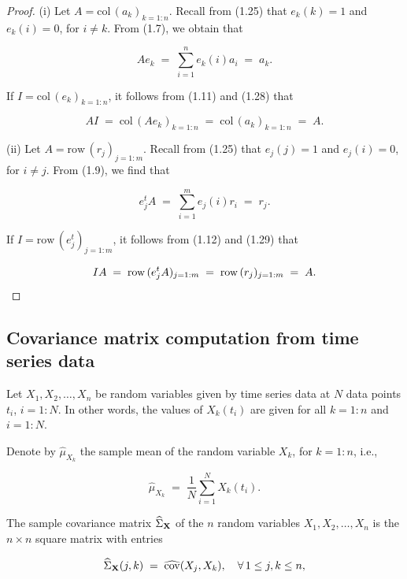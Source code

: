 \begin{proof}
(i) Let $A=\mathrm{col}\,(a_k)_{k=1:n}$. Recall from (1.25) that
$e_k(k)=1$ and $e_k(i)=0$, for $i\ne k$. From (1.7), we obtain that

\begin{equation}
Ae_k \;=\; \sum_{i=1}^n e_k(i)a_i \;=\; a_k.
\end{equation}

If $I=\mathrm{col}\,(e_k)_{k=1:n}$, it follows from (1.11) and (1.28) that

\[
AI \;=\; \mathrm{col}\,(Ae_k)_{k=1:n} \;=\; \mathrm{col}\,(a_k)_{k=1:n} \;=\; A.
\]

(ii) Let $A=\mathrm{row}\,(r_j)_{j=1:m}$. Recall from (1.25) that
$e_j(j)=1$ and $e_j(i)=0$, for $i\ne j$. From (1.9), we find that

\begin{equation}
e_j^tA \;=\; \sum_{i=1}^m e_j(i)r_i \;=\; r_j.
\end{equation}

If $I=\mathrm{row}\,(e_j^t)_{j=1:m}$, it follows from (1.12) and (1.29)
that

\begin{equation*}
IA \;=\; \mathrm{row}\,(e_j^tA)_{j=1:m} \;=\; \mathrm{row}\,(r_j)_{j=1:m} \;=\; A. \qedhere
\end{equation*}
\end{proof}

\subsection{Covariance matrix computation from time series data}

Let $X_1, X_2, \ldots, X_n$ be random variables given by time series data
at $N$ data points $t_i$, $i=1:N$. In other words, the values of $X_k(t_i)$
are given for all $k=1:n$ and $i=1:N$.

Denote by $\widehat{\mu}_{X_k}$ the sample mean of the random variable
$X_k$, for $k=1:n$, i.e.,

\[
\widehat{\mu}_{X_k} \;=\; \frac{1}{N}\sum_{i=1}^N X_k(t_i).
\]

The sample covariance matrix $\widehat{\Sigma}_{\mathbf{X}}$ of the $n$ random
variables $X_1, X_2, \ldots, X_n$ is the $n\times n$ square matrix with
entries

\begin{equation}
\widehat{\Sigma}_{\mathbf{X}}(j,k) \;=\; \widehat{\operatorname{cov}}(X_j,X_k), \quad \forall\, 1\le j,k\le n,
\end{equation}

